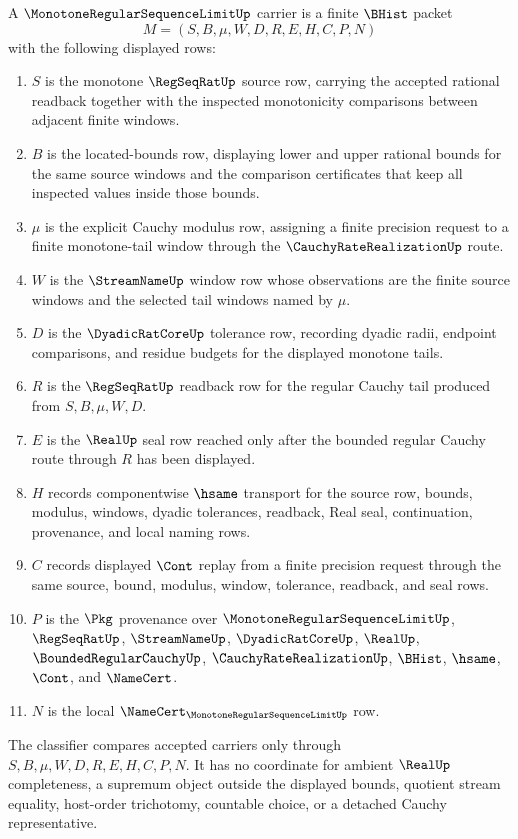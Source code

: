 \begin{definition}
\label{def:monotone-regular-sequence-limit-carrier}
A $\MonotoneRegularSequenceLimitUp$ carrier is a finite $\BHist$ packet
$$
M=(S,B,\mu,W,D,R,E,H,C,P,N)
$$
with the following displayed rows:
\begin{enumerate}
\item $S$ is the monotone $\RegSeqRatUp$ source row, carrying the accepted rational readback together with the inspected monotonicity comparisons between adjacent finite windows.
\item $B$ is the located-bounds row, displaying lower and upper rational bounds for the same source windows and the comparison certificates that keep all inspected values inside those bounds.
\item $\mu$ is the explicit Cauchy modulus row, assigning a finite precision request to a finite monotone-tail window through the $\CauchyRateRealizationUp$ route.
\item $W$ is the $\StreamNameUp$ window row whose observations are the finite source windows and the selected tail windows named by $\mu$.
\item $D$ is the $\DyadicRatCoreUp$ tolerance row, recording dyadic radii, endpoint comparisons, and residue budgets for the displayed monotone tails.
\item $R$ is the $\RegSeqRatUp$ readback row for the regular Cauchy tail produced from $S,B,\mu,W,D$.
\item $E$ is the $\RealUp$ seal row reached only after the bounded regular Cauchy route through $R$ has been displayed.
\item $H$ records componentwise $\hsame$ transport for the source row, bounds, modulus, windows, dyadic tolerances, readback, Real seal, continuation, provenance, and local naming rows.
\item $C$ records displayed $\Cont$ replay from a finite precision request through the same source, bound, modulus, window, tolerance, readback, and seal rows.
\item $P$ is the $\Pkg$ provenance over $\MonotoneRegularSequenceLimitUp$, $\RegSeqRatUp$, $\StreamNameUp$, $\DyadicRatCoreUp$, $\RealUp$, $\BoundedRegularCauchyUp$, $\CauchyRateRealizationUp$, $\BHist$, $\hsame$, $\Cont$, and $\NameCert$.
\item $N$ is the local $\NameCert_{\MonotoneRegularSequenceLimitUp}$ row.
\end{enumerate}
The classifier compares accepted carriers only through $S,B,\mu,W,D,R,E,H,C,P,N$. It has no coordinate for ambient $\RealUp$ completeness, a supremum object outside the displayed bounds, quotient stream equality, host-order trichotomy, countable choice, or a detached Cauchy representative.
\end{definition}

